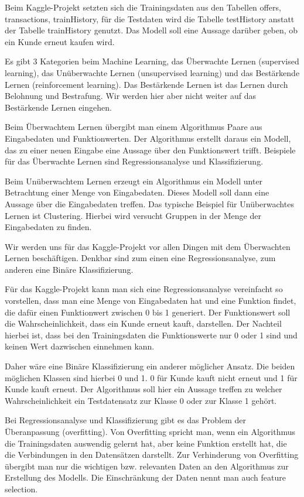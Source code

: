 Beim Kaggle-Projekt setzten sich die Trainingsdaten aus den Tabellen offers, transactions, trainHistory, für die Testdaten wird die Tabelle testHistory anstatt der Tabelle trainHistory genutzt. Das Modell soll eine Aussage darüber geben, ob ein Kunde erneut kaufen wird.

Es gibt 3 Kategorien beim Machine Learning, das Überwachte Lernen (supervised learning), das Unüberwachte Lernen (unsupervised learning) und das Bestärkende Lernen (reinforcement learning). Das Bestärkende Lernen ist das Lernen durch Belohnung und Bestrafung. Wir werden hier aber nicht weiter auf das Bestärkende Lernen eingehen.

Beim Überwachtem Lernen übergibt man einem Algorithmus Paare aus Eingabedaten und Funktionwerten. Der Algorithmus erstellt daraus ein Modell, das zu einer neuen Eingabe eine Aussage über den Funktionswert trifft. Beispiele für das Überwachte Lernen sind Regressionsanalyse und Klassifizierung.

Beim Unüberwachtem Lernen erzeugt ein Algorithmus ein Modell unter Betrachtung einer Menge von Eingabedaten. Dieses Modell soll dann eine Aussage über die Eingabedaten treffen. Das typische Beispiel für Unüberwachtes Lernen ist Clustering. Hierbei wird versucht Gruppen in der Menge der Eingabedaten zu finden.

Wir werden uns für das Kaggle-Projekt vor allen Dingen mit dem Überwachten Lernen beschäftigen. Denkbar sind zum einen eine Regressionsanalyse, zum anderen eine Binäre Klassifizierung.

Für das Kaggle-Projekt kann man sich eine Regressionsanalyse vereinfacht so vorstellen, dass man eine Menge von Eingabedaten hat und eine Funktion findet, die dafür einen Funktionwert zwischen 0 bis 1 generiert. Der Funktionswert soll die Wahrscheinlichkeit, dass ein Kunde erneut kauft, darstellen. Der Nachteil hierbei ist, dass bei den Trainingsdaten die Funktionswerte nur 0 oder 1 sind und keinen Wert dazwischen einnehmen kann.

Daher wäre eine Binäre Klassifizierung ein anderer möglicher Ansatz. Die beiden möglichen Klassen sind hierbei 0 und 1. 0 für Kunde kauft nicht erneut und 1 für Kunde kauft erneut. Der Algorithmus soll hier ein Aussage treffen zu welcher Wahrscheinlichkeit ein Testdatensatz zur Klasse 0 oder zur Klasse 1 gehört.

Bei Regressionsanalyse und Klassifizierung gibt es das Problem der Überanpassung (overfitting). Von Overfitting spricht man, wenn ein Algorithmus die Trainingsdaten auswendig gelernt hat, aber keine Funktion erstellt hat, die die Verbindungen in den Datensätzen darstellt. Zur Verhinderung von Overfitting übergibt man nur die wichtigen bzw. relevanten Daten an den Algorithmus zur Erstellung des Modells. Die Einschränkung der Daten nennt man auch feature selection.

